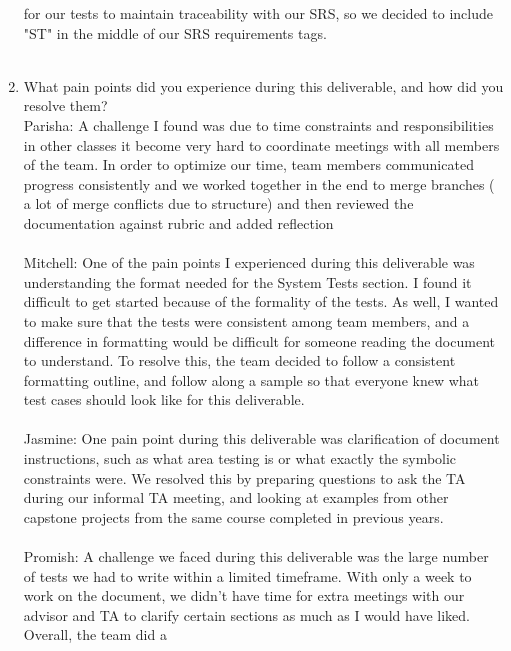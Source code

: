 \documentclass[12pt, titlepage]{article}
\begin{document}
\begin{enumerate}
  for our tests to maintain traceability with our SRS, so we decided to include "ST" in 
  the middle of our SRS requirements tags.\\\\
  \item What pain points did you experience during this deliverable, and how
    did you resolve them?\\
  \newline
  \hspace{2em} Parisha: A challenge I found was due to time constraints and responsibilities
   in other classes it become very hard to coordinate meetings with all members of the team. 
   In order to optimize our time, team members communicated progress consistently and we worked together
    in the end to merge branches ( a lot of merge conflicts due to structure) and then reviewed the documentation
    against rubric and added reflection \\\\
  \hspace{2em} Mitchell: One of the pain points I experienced during this deliverable was understanding the
  format needed for the System Tests section. I found it difficult to get started because of the formality
  of the tests. As well, I wanted to make sure that the tests were consistent among team members, and a difference
  in formatting would be difficult for someone reading the document to understand. To resolve this, the team decided
  to follow a consistent formatting outline, and follow along a sample so that everyone knew what test cases
  should look like for this deliverable.\\\\
  \hspace{2em} Jasmine: One pain point during this deliverable was clarification of document instructions, 
  such as what area testing is or what exactly the symbolic constraints were. We resolved this by preparing 
  questions to ask the TA during our informal TA meeting, and looking at examples from other capstone projects 
  from the same course completed in previous years.\\\\
  \hspace{2em} Promish: A challenge we faced during this deliverable was the 
  large number of tests we had to write within a limited timeframe. With only a week 
  to work on the document, we didn’t have time for extra meetings with our advisor and 
  TA to clarify certain sections as much as I would have liked. Overall, the team did a 

\end{enumerate}
\end{document}
